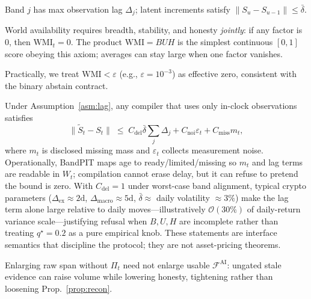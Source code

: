 \documentclass[sigconf,anonymous]{acmart}
\theoremstyle{acmdefinition}%
\theoremstyle{acmplain}%
\begin{document}
\begin{assumption}
\label{asm:lag}
Band \(j\) has max observation lag \(\Delta_j\); latent increments satisfy \(\|S_u-S_{u-1}\|\le\bar\delta\).
\end{assumption}

\begin{assumption}
\label{asm:mult}
World availability requires breadth, stability, and honesty \emph{jointly}: if any factor is \(0\), then \(\mathrm{WMI}_t=0\).
The product \(\mathrm{WMI}=BUH\) is the simplest continuous \([0,1]\) score obeying this axiom; averages can stay large when one factor vanishes.
\end{assumption}
\begin{remark}
Practically, we treat \(\mathrm{WMI}<\varepsilon\) (e.g., \(\varepsilon{=}10^{-3}\)) as effective zero, consistent with the binary abstain contract.
\end{remark}

\begin{proposition}
\label{prop:recon}
Under Assumption~\ref{asm:lag}, any compiler that uses only in-clock observations satisfies
\[
\|\widetilde S_t-S_t\|
\;\le\;
C_{\mathrm{del}}\bar\delta\sum_j\Delta_j
+C_{\mathrm{noi}}\varepsilon_t
+C_{\mathrm{miss}}m_t,
\]
where \(m_t\) is disclosed missing mass and \(\varepsilon_t\) collects measurement noise.
Operationally, BandPIT maps age to ready/limited/missing so \(m_t\) and lag terms are readable in \(W_t\); compilation cannot erase delay, but it can refuse to pretend the bound is zero.
With \(C_{\mathrm{del}}{=}1\) under worst-case band alignment, typical crypto parameters (\(\Delta_{\mathrm{ex}}{\approx}2\mathrm{d}\), \(\Delta_{\mathrm{macro}}{\approx}5\mathrm{d}\), \(\bar\delta{\approx}\) daily volatility \({\approx}3\%\)) make the lag term alone large relative to daily moves---illustratively \(\mathcal{O}(30\%)\) of daily-return variance scale---justifying refusal when \(B,U,H\) are incomplete rather than treating \(q^\star{=}0.2\) as a pure empirical knob.
These statements are interface semantics that discipline the protocol; they are not asset-pricing theorems.
\end{proposition}

\begin{proposition}
\label{prop:compile}
Enlarging raw span without \(\Pi_t\) need not enlarge usable \(\mathcal{F}^{\mathrm{AI}}\): ungated stale evidence can raise volume while lowering honesty, tightening rather than loosening Prop.~\ref{prop:recon}.
\end{proposition}
\end{document}
